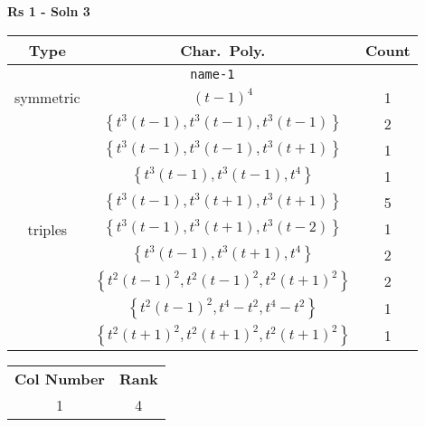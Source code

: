 \documentclass{article}
\begin{document}
    
    \textbf{Rs 1 - Soln 3}
    \begin{table}
    \begin{tabular}{|c|c|c|}
    \hline
    \textbf{Type} & \textbf{Char.~Poly.} & \textbf{Count} \\
    \hline \multicolumn{3}{|c|}{\texttt{name-1}} \\ \hline
    \multirow{1}{*}{symmetric}
     & $(t - 1)^4$ & 1 \\
    \hline
    \multirow{9}{*}{triples}
     & $\left\{t^3(t - 1),t^3(t - 1),t^3(t - 1)\right\}$ & 2 \\
     & $\left\{t^3(t - 1),t^3(t - 1),t^3(t + 1)\right\}$ & 1 \\
     & $\left\{t^3(t - 1),t^3(t - 1),t^4\right\}$ & 1 \\
     & $\left\{t^3(t - 1),t^3(t + 1),t^3(t + 1)\right\}$ & 5 \\
     & $\left\{t^3(t - 1),t^3(t + 1),t^3(t - 2)\right\}$ & 1 \\
     & $\left\{t^3(t - 1),t^3(t + 1),t^4\right\}$ & 2 \\
     & $\left\{t^2(t - 1)^2,t^2(t - 1)^2,t^2(t + 1)^2\right\}$ & 2 \\
     & $\left\{t^2(t - 1)^2,t^4 - t^2,t^4 - t^2\right\}$ & 1 \\
     & $\left\{t^2(t + 1)^2,t^2(t + 1)^2,t^2(t + 1)^2\right\}$ & 1 \\
    \hline
    \end{tabular}
    \end{table}
    \begin{table}
    \begin{tabular}{|c|c|}
    \hline
    \textbf{Col Number} & \textbf{Rank}\\
    1 & 4 \\ 
    \hline
    \end{tabular}
    \end{table}
    \newpage
    
\end{document}
